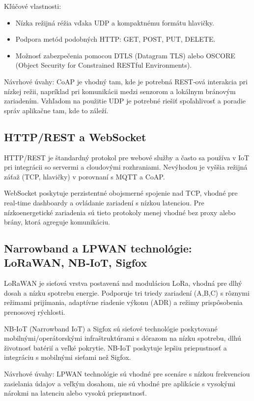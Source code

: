 Kľúčové vlastnosti:
\begin{itemize}
  \item Nízka režijná réžia vďaka UDP a kompaktnému formátu hlavičky.
  \item Podpora metód podobných HTTP: GET, POST, PUT, DELETE.
  \item Možnosť zabezpečenia pomocou DTLS (Datagram TLS) alebo OSCORE (Object Security for Constrained RESTful Environments).
\end{itemize}

Návrhové úvahy: CoAP je vhodný tam, kde je potrebná REST‑ová interakcia pri nízkej režii, napríklad pri komunikácii medzi senzorom a lokálnym bránovým zariadením. Vzhľadom na použitie UDP je potrebné riešiť spoľahlivosť a poradie správ aplikačne tam, kde to záleží.

\subsection{HTTP/REST a WebSocket}

HTTP/REST je štandardný protokol pre webové služby a často sa používa v IoT pri integrácii so servermi a cloudovými rozhraniami. Nevýhodou je vyššia režijná záťaž (TCP, hlavičky) v porovnaní s MQTT a CoAP.

WebSocket poskytuje perzistentné obojsmerné spojenie nad TCP, vhodné pre real‑time dashboardy a ovládanie zariadení s nízkou latenciou. Pre nízkoenergetické zariadenia sú tieto protokoly menej vhodné bez proxy alebo brány, ktorá agreguje komunikáciu.

\subsection{Narrowband a LPWAN technológie: LoRaWAN, NB‑IoT, Sigfox}

LoRaWAN je sieťová vrstva postavená nad moduláciou LoRa, vhodná pre dlhý dosah a nízku spotrebu energie. Podporuje tri triedy zariadení (A,B,C) s rôznymi režimami prijímania, adaptívne riadenie výkonu (ADR) a režimy prispôsobenia prenosovej rýchlosti.

NB‑IoT (Narrowband IoT) a Sigfox sú sieťové technológie poskytované mobilnými/operátorskými infraštruktúrami s dôrazom na nízku spotrebu, dlhú životnosť batérií a veľké pokrytie. NB‑IoT poskytuje lepšiu priepustnosť a integráciu s mobilnými sieťami než Sigfox.

Návrhové úvahy: LPWAN technológie sú vhodné pre scenáre s nízkou frekvenciou zasielania údajov a veľkým dosahom, nie sú vhodné pre aplikácie s vysokými nárokmi na latenciu alebo vysokú priepustnosť.

